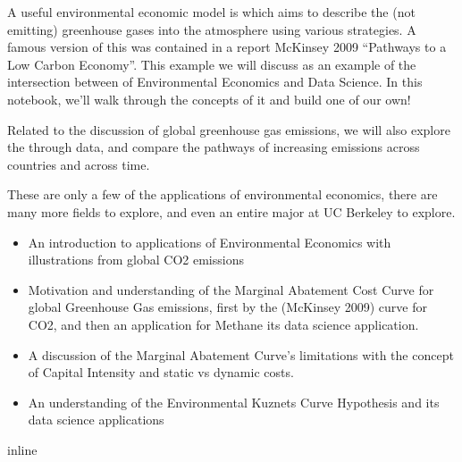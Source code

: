 \documentclass[letterpaper,10pt,english]{jupyterBook}
\begin{document}
\sphinxAtStartPar
A useful environmental economic model is  which aims to describe the  (not emitting) greenhouse gases into the atmosphere using various strategies. A famous version of this was contained in a report  McKinsey 2009 “Pathways to a Low Carbon Economy”.  This example we will discuss as an  example of the intersection between of Environmental Economics and Data Science. In this notebook, we’ll walk through the concepts of it and build one of our own!

\sphinxAtStartPar
Related to the discussion of global greenhouse gas emissions, we will also explore the  through data, and compare the pathways of increasing emissions across countries and across time.

\sphinxAtStartPar
These are only a few of the applications of environmental economics, there are many more fields to explore, and even an entire major at UC Berkeley to explore.

\sphinxAtStartPar
{}
\begin{itemize}
\item {} 
\sphinxAtStartPar
An introduction to applications  of Environmental Economics with illustrations from global CO2 emissions

\item {} 
\sphinxAtStartPar
Motivation and understanding of the  Marginal Abatement Cost Curve for global Greenhouse Gas emissions, first by the (McKinsey 2009) curve for CO2, and then an application for Methane its data science application.

\item {} 
\sphinxAtStartPar
A discussion of the Marginal Abatement Curve’s limitations with the concept of Capital Intensity and static vs dynamic costs.

\item {} 
\sphinxAtStartPar
An understanding of the Environmental Kuznets Curve Hypothesis and its data science applications

\end{itemize}

\begin{sphinxVerbatim}[commandchars=\\\{\}]
   
   
 inline 

   
   
   
\end{sphinxVerbatim}
\end{document}
